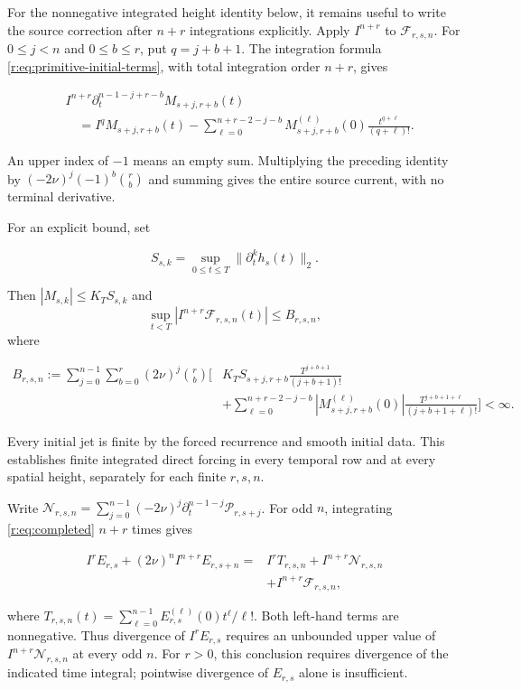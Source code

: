 For the nonnegative integrated height identity below, it remains useful
to write the source correction after \(n+r\) integrations explicitly.
Apply $I^{n+r}$ to \(\mathcal F_{r,s,n}\). For $0\le j<n$ and $0\le b\le r$, put $q=j+b+1$. The integration formula \eqref{r:eq:primitive-initial-terms}, with total integration order $n+r$, gives

\[
\begin{aligned}
&I^{n+r}
\partial_t^{n-1-j+r-b}M_{s+j,r+b}(t)\\
&\quad=I^qM_{s+j,r+b}(t)
-\sum_{\ell=0}^{n+r-2-j-b}
M_{s+j,r+b}^{(\ell)}(0)
\frac{t^{q+\ell}}{(q+\ell)!}.
\end{aligned}
\]

An upper index of \(-1\) means an empty sum. Multiplying the preceding identity by
$(-2\nu)^j(-1)^b\binom rb$ and summing gives the entire source current, with no terminal derivative.

For an explicit bound, set

\[
S_{s,k}=\sup_{0\le t\le T}\|\partial_t^kh_s(t)\|_2.
\]

Then $|M_{s,k}|\le K_TS_{s,k}$ and
\[
\sup_{t<T}|I^{n+r}\mathcal F_{r,s,n}(t)|\le B_{r,s,n},
\]
where

\[
\begin{aligned}
B_{r,s,n}:=
\sum_{j=0}^{n-1}\sum_{b=0}^r
(2\nu)^j\binom rb
\Bigg[
&K_TS_{s+j,r+b}\frac{T^{j+b+1}}{(j+b+1)!}\\
&+\sum_{\ell=0}^{n+r-2-j-b}
|M_{s+j,r+b}^{(\ell)}(0)|
\frac{T^{j+b+1+\ell}}{(j+b+1+\ell)!}
\Bigg]<\infty .
\end{aligned}
\]

Every initial jet is finite by the forced recurrence and smooth initial data. This establishes finite integrated direct forcing in every temporal row and at every spatial height, separately for each finite $r,s,n$.

Write
\(\mathcal N_{r,s,n}=\sum_{j=0}^{n-1}(-2\nu)^j
\partial_t^{n-1-j}\mathcal P_{r,s+j}\).
For odd \(n\), integrating \eqref{r:eq:completed} $n+r$ times gives

\[
\begin{aligned}
I^rE_{r,s}
+(2\nu)^nI^{n+r}E_{r,s+n}
={}&I^rT_{r,s,n}
+I^{n+r}\mathcal N_{r,s,n}\\
&+I^{n+r}\mathcal F_{r,s,n},
\end{aligned}
\]

where
$T_{r,s,n}(t)=\sum_{\ell=0}^{n-1}E_{r,s}^{(\ell)}(0)t^\ell/\ell!$.
Both left-hand terms are nonnegative. Thus divergence of $I^rE_{r,s}$ requires an unbounded upper value of $I^{n+r}\mathcal N_{r,s,n}$ at every odd $n$. For $r>0$, this conclusion requires divergence of the indicated time integral; pointwise divergence of $E_{r,s}$ alone is insufficient.
